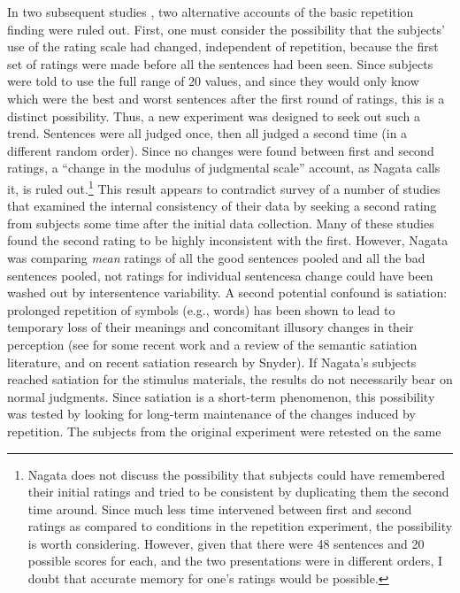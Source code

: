 In two subsequent studies \citep{Nagata1987a,Nagata1987b}, two alternative accounts of the basic repetition finding were ruled out. First, one must consider the possibility that the subjects' use of the rating scale had changed, independent of repetition, because the first set of ratings were made before all the sentences had been seen. Since subjects were told to use the full range of 20 values, and since they would only know which were the best and worst sentences after the first round of ratings, this is a distinct possibility. Thus, a new experiment was designed to seek out such a trend. Sentences were all judged once, then all judged a second time (in a different random order). Since no changes were found between first and second ratings, a ``change in the modulus of judgmental scale'' account, as Nagata calls it, is ruled out.\footnote{Nagata does not discuss the possibility that subjects could have remembered their initial ratings and tried to be consistent by duplicating them the second time around. Since much less time intervened between first and second ratings as compared to conditions in the repetition experiment, the possibility is worth considering. However, given that there were 48 sentences and 20 possible scores for each, and the two presentations were in different orders, I doubt that accurate memory for one's ratings would be possible.}
 This result appears to contradict  survey of a number of studies that examined the internal consistency of their data by seeking a second rating from subjects some time after the initial data collection. Many of these studies found the second rating to be highly inconsistent with the first. However, Nagata was comparing \textit{mean} ratings of all the good sentences pooled and all the bad sentences pooled, not ratings for individual sentences\schdash{}a change could have been washed out by intersentence variability. A second potential confound is satiation: prolonged repetition of symbols (e.g., words) has been shown to lead to temporary loss of their meanings and concomitant illusory changes in their perception (see \citet{Pynte1991} for some recent work and a review of the semantic satiation literature, and  on recent satiation research by Snyder). If Nagata's subjects reached satiation for the stimulus materials, the results do not necessarily bear on normal judgments. Since satiation is a short-term phenomenon, this possibility was tested by looking for long-term maintenance of the changes induced by repetition. The subjects from the original experiment were retested on the same
